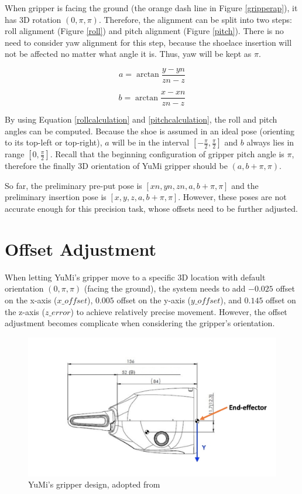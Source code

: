 When gripper is facing the ground (the orange dash line in Figure \ref{gripperap}), it has 3D rotation $(0, \pi, \pi)$. Therefore, the alignment can be split into two steps: roll alignment (Figure \ref{roll}) and pitch alignment (Figure \ref{pitch}). There is no need to consider yaw alignment for this step, because the shoelace insertion will not be affected no matter what angle it is. Thus, yaw will be kept as $\pi$.

\begin{equation}
a = \arctan \frac{y - yn}{zn - z}
\label{rollcalculation}
\end{equation}

\begin{equation}
b = \arctan \frac{x - xn}{zn - z}
\label{pitchcalculation}
\end{equation}

By using Equation \ref{rollcalculation} and \ref{pitchcalculation}, the roll and pitch angles can be computed. Because the shoe is assumed in an ideal pose (orienting to its top-left or top-right), $a$ will be in the interval $[-\frac{\pi}{2}, \frac{\pi}{2}]$ and $b$ always lies in range $[0, \frac{\pi}{2}]$. Recall that the beginning configuration of gripper pitch angle is $\pi$, therefore the finally 3D orientation of YuMi gripper should be $(a, b + \pi, \pi)$. 

So far, the preliminary pre-put pose is $[xn, yn, zn, a, b + \pi, \pi]$ and the preliminary insertion pose is $[x, y, z, a, b + \pi, \pi]$. However, these poses are not accurate enough for this precision task, whose offsets need to be further adjusted.

\section{Offset Adjustment}
When letting YuMi's gripper move to a specific 3D location with default orientation $(0, \pi, \pi)$ (facing the ground), the system needs to add $-0.025$ offset on the x-axis ($x\_offset$), $0.005$ offset on the y-axis ($y\_offset$), and $0.145$ offset on the z-axis ($z\_error$) to achieve relatively precise movement. However, the offset adjustment becomes complicate when considering the gripper's orientation.

\begin{figure}[H]
\centering
\includegraphics[width = 0.8\columnwidth]{Implementation/mp/gripperoffset.png}
\caption{YuMi's gripper design, adopted from \citep{Productspecification}}
\label{gripperoffset}
\end{figure}

